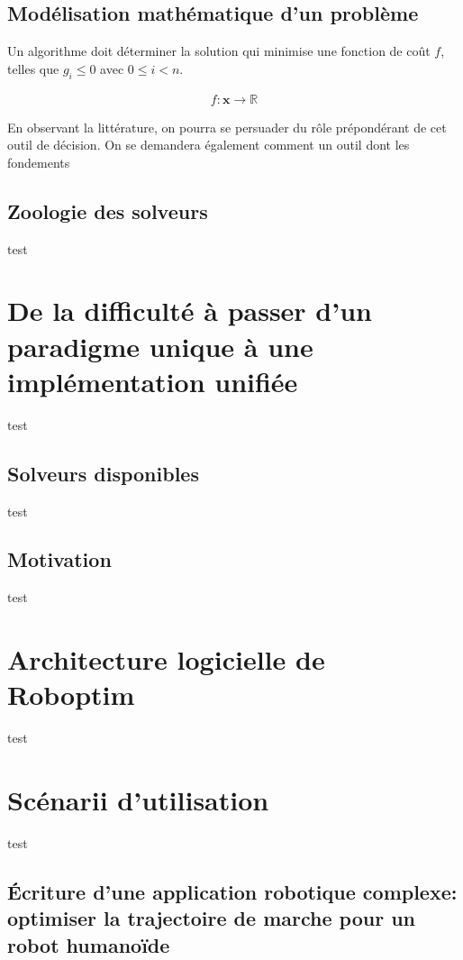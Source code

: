 \subsection{Modélisation mathématique d'un problème}


Un algorithme doit déterminer la solution qui
minimise une fonction de coût $f$, telles que $g_i \leq 0$ avec $0
\leq i < n$.

\begin{eqnarray}\label{eq:chap1_optim}
  f : \mathbf{x} \to \mathbb{R}
\end{eqnarray}


En observant la littérature, on pourra se persuader du rôle
prépondérant de cet outil de décision. On se demandera également comment un outil dont les fondements

\subsection{Zoologie des solveurs}

test


\section[FIXME]{De la difficulté à passer d'un paradigme unique à une implémentation unifiée}

test

\subsection{Solveurs disponibles}

test

\subsection{Motivation}

test


\section{Architecture logicielle de Roboptim}

test

\section{Scénarii d'utilisation}

test

\subsection[FIXME]{\'Ecriture d'une application robotique complexe: optimiser la trajectoire de marche pour un robot humanoïde}

